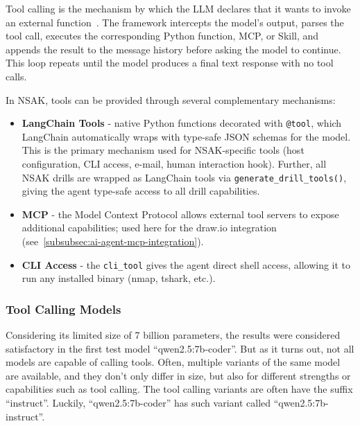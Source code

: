 Tool calling is the mechanism by which the \gls{LLM} declares that it wants to invoke an external function~\cite{langchain_docs}.
The framework intercepts the model's output, parses the tool call, executes the corresponding Python function, \gls{MCP}, or Skill,
and appends the result to the message history before asking the model to continue.
This loop repeats until the model produces a final text response with no tool calls.

In \gls{NSAK}, tools can be provided through several complementary mechanisms:

\begin{itemize}
    \item \textbf{LangChain Tools} - native Python functions decorated with \texttt{@tool},
    which LangChain automatically wraps with type-safe \gls{JSON} schemas for the model.
    This is the primary mechanism used for \gls{NSAK}-specific tools (host configuration, \gls{CLI} access, e-mail, human interaction hook).
    Further, all \gls{NSAK} drills are wrapped as LangChain tools via \texttt{generate_drill_tools()},
    giving the agent type-safe access to all drill capabilities.
    \item \textbf{\gls{MCP}} - the Model Context Protocol allows external tool servers to expose additional capabilities;
    used here for the draw.io integration (see~\ref{subsubsec:ai-agent-mcp-integration}).
    \item \textbf{\gls{CLI} Access} - the \texttt{cli_tool} gives the agent direct shell access,
    allowing it to run any installed binary (nmap, tshark, etc.).
\end{itemize}

\subsubsection{Tool Calling Models}\label{subsubsec:ai-agent-tool-calling-models}

Considering its limited size of 7 billion parameters, the results were considered satisfactory in the first test model \enquote{qwen2.5:7b-coder}.
But as it turns out, not all models are capable of calling tools.
Often, multiple variants of the same model are available, and they don't only differ in size,
but also for different strengths or capabilities such as tool calling.
The tool calling variants are often have the suffix \enquote{instruct}.
Luckily, \enquote{qwen2.5:7b-coder} has such variant called \enquote{qwen2.5:7b-instruct}.

